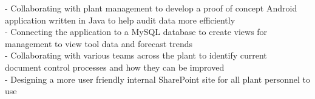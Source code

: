 \documentclass[]{friggeri-cv}
\begin{document}
\begin{entrylist}
{    - Collaborating with plant management to develop a proof of concept Android application written in Java to help audit data more efficiently\\
    - Connecting the application to a MySQL database to create views for \\management to view tool data and forecast trends\\
    - Collaborating with various teams across the plant to identify current \\document control processes and how they can be improved\\
    - Designing a more user friendly internal SharePoint site for all plant personnel to use\\}

\end{entrylist}
\end{document}
